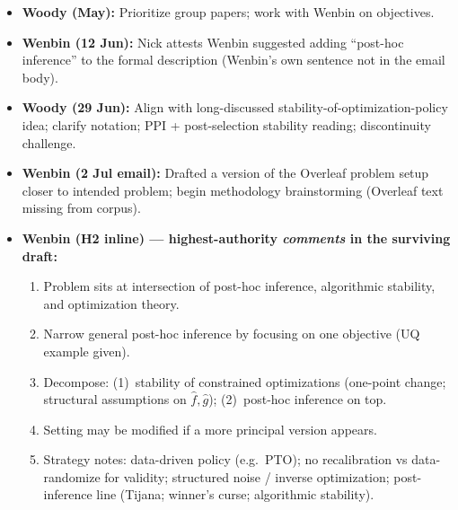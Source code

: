 \documentclass[11pt]{article}
\begin{document}
\begin{itemize}[leftmargin=*]
  \item \textbf{Woody (May):} Prioritize group papers; work with Wenbin on objectives.
  \item \textbf{Wenbin (12 Jun):} Nick attests Wenbin suggested adding ``post-hoc inference''
        to the formal description (Wenbin's own sentence not in the email body).
  \item \textbf{Woody (29 Jun):} Align with long-discussed stability-of-optimization-policy idea;
        clarify notation; PPI + post-selection stability reading; discontinuity challenge.
  \item \textbf{Wenbin (2 Jul email):} Drafted a version of the Overleaf problem setup closer to
        intended problem; begin methodology brainstorming (Overleaf text missing from corpus).
  \item \textbf{Wenbin (H2 inline) --- highest-authority \emph{comments} in the surviving draft:}
        \begin{enumerate}[leftmargin=*]
          \item Problem sits at intersection of post-hoc inference, algorithmic stability, and
                optimization theory.
          \item Narrow general post-hoc inference by focusing on one objective (UQ example given).
          \item Decompose: (1)~stability of constrained optimizations (one-point change; structural
                assumptions on $\hat f,\hat g$); (2)~post-hoc inference on top.
          \item Setting may be modified if a more principal version appears.
          \item Strategy notes: data-driven policy (e.g.\ PTO); no recalibration vs data-randomize
                for validity; structured noise / inverse optimization; post-inference line
                (Tijana; winner's curse; algorithmic stability).
        \end{enumerate}
\end{itemize}
\end{document}
